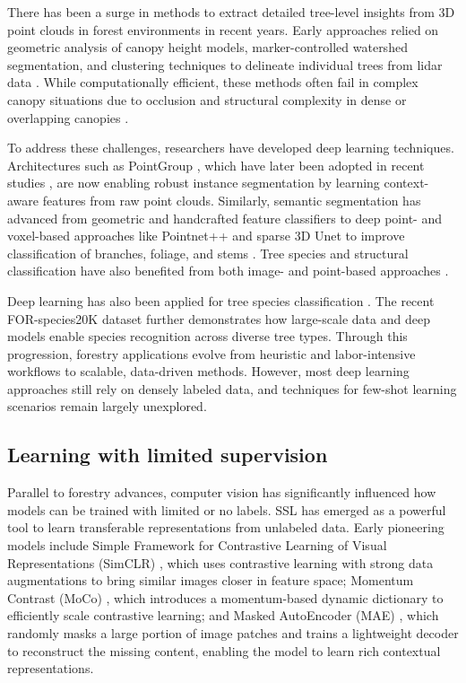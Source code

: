 \documentclass[review,authoryear]{elsarticle}
\begin{document}
 There has been a surge in methods to extract detailed tree-level insights from 3D point clouds in forest environments in recent years. Early approaches relied on geometric analysis of canopy height models, marker-controlled watershed segmentation, and clustering techniques to delineate individual trees from lidar data \citep{Li2012Segmenting, DalponteCoomes2016, Chen2006Isolating, Silva02092016, ROUSSEL2020112061, 9033973, drones8120772}. While computationally efficient, these methods often fail in complex canopy situations due to occlusion and structural complexity in dense or overlapping canopies \citep{HENRICH2024102888}.

To address these challenges, researchers have developed deep learning techniques. Architectures such as PointGroup \citep{Jiang2020PointGroup}, which have later been adopted in recent studies \citep{XIANG2024114078, WIELGOSZ2024114367, HENRICH2024102888}, are now enabling robust instance segmentation by learning context-aware features from raw point clouds. Similarly, semantic segmentation has advanced from geometric and handcrafted feature classifiers to deep point- and voxel-based approaches like Pointnet++ and sparse 3D Unet to improve classification of branches, foliage, and stems \citep{rs15194793, XIANG2024114078}. Tree species and structural classification have also benefited from both image- and point-based approaches \citep{HAMRAZ2019219, BOLYN2022113205, rs17071190}. 

Deep learning has also been applied for tree species classification \citep{liu2022tree,vahrenhold2025mmtscnet,fan2023tree}. The recent FOR-species20K dataset \citep{Puliti2025} further demonstrates how large-scale data and deep models enable species recognition across diverse tree types. Through this progression, forestry applications evolve from heuristic and labor-intensive workflows to scalable, data-driven methods. However, most deep learning approaches still rely on densely labeled data, and techniques for few-shot learning scenarios remain largely unexplored.

\subsection{Learning with limited supervision}
Parallel to forestry advances, computer vision has significantly influenced how models can be trained with limited or no labels. SSL has emerged as a powerful tool to learn transferable representations from unlabeled data. Early pioneering models include Simple Framework for Contrastive Learning of Visual Representations (SimCLR) \citep{chen2020simple}, which uses contrastive learning with strong data augmentations to bring similar images closer in feature space; Momentum Contrast (MoCo) \citep{he2020momentum}, which introduces a momentum-based dynamic dictionary to efficiently scale contrastive learning; and Masked AutoEncoder (MAE) \citep{he2022masked}, which randomly masks a large portion of image patches and trains a lightweight decoder to reconstruct the missing content, enabling the model to learn rich contextual representations.
\end{document}
